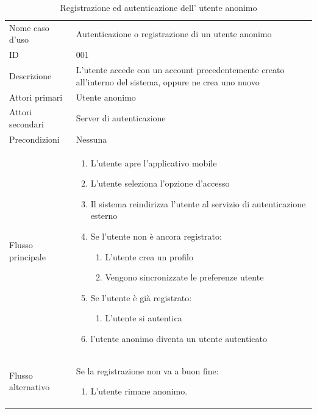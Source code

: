 \documentclass{article}
\begin{document}
\begin{table}[htbp]
    \label{8.1.1}
    \centering
    \begin{tabularx}{\textwidth}{| l | p{} |}
        \Xhline{2pt} %
        Nome caso d'uso & Autenticazione o registrazione di un utente anonimo \\
        \Xhline{2pt} %
        ID & 001 \\
        \hline
        Descrizione & L'utente accede con un account precedentemente creato all'interno del sistema, oppure ne crea uno nuovo \\
        \hline
        Attori primari & Utente anonimo \\
        \hline
        Attori secondari & Server di autenticazione \\
        \hline
        Precondizioni & Nessuna \\
        \hline
        Flusso principale & 
        \begin{enumerate}[topsep=5pt,partopsep=0pt,parsep=0pt,itemsep=0pt,before=\vspace{-\baselineskip},after=\vspace{-\baselineskip}]                
            \item L'utente apre l'applicativo mobile
            \item L'utente seleziona l'opzione d'accesso
            \item Il sistema reindirizza l'utente al servizio di autenticazione esterno
            \item Se l'utente non è ancora registrato:
            \begin{enumerate}[leftmargin=*, nosep]
                \item L'utente crea un profilo
                \item Vengono sincronizzate le preferenze utente
            \end{enumerate}
            \item Se l'utente è già registrato:
            \begin{enumerate}[leftmargin=*, nosep]
            	\item L'utente si autentica
            \end{enumerate}
            \item l'utente anonimo diventa un utente autenticato
        \end{enumerate}
        \\
        \hline
        Flusso alternativo & 
        Se la registrazione non va a buon fine:
        \begin{enumerate}[topsep=12pt,partopsep=0pt,parsep=0pt,itemsep=0pt,before=\vspace{-\baselineskip},after=\vspace{-\baselineskip}]
            \item L'utente rimane anonimo.
        \end{enumerate}
        \\
        \hline
    \end{tabularx}
    \caption{Registrazione ed autenticazione dell' utente anonimo}
    \label{tab:tabella_use_case001}
\end{table}
\end{document}
